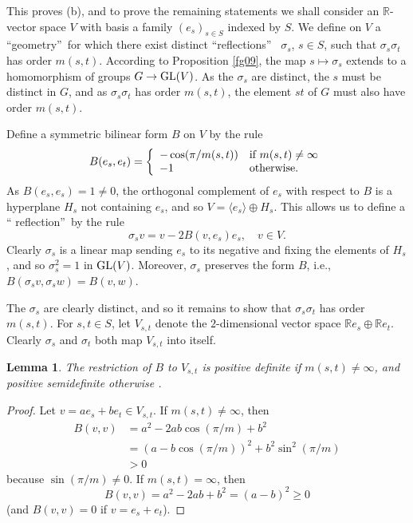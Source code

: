 \documentclass[a4paper,11pt,final,openany]{memoir}%
\newtheorem{lemma}[X]{Lemma}
\theoremstyle{nonumberplain}
\newtheorem{proof}{Proof.}
\begin{document}
This proves (b), and to prove the remaining statements we shall consider an
$\mathbb{R}{}$-vector space $V$ with basis a family $(e_{s})_{s\in S}$ indexed
by $S$. We define on $V$ a \textquotedblleft geometry\textquotedblright\ for
which there exist distinct \textquotedblleft reflections\textquotedblright%
\ $\sigma_{s}$, $s\in S$, such that $\sigma_{s}\sigma_{t}$ has order $m(s,t)$.
According to Proposition \ref{fg09}, the map $s\mapsto\sigma_{s}$ extends to a
homomorphism of groups $G\rightarrow\operatorname{GL}(V)$. As the $\sigma_{s}$ are distinct,
the $s$ must be distinct in $G$, and as $\sigma_{s}\sigma_{t}$ has order
$m(s,t)$, the element $st$ of $G$ must also have order $m(s,t)$.

Define a symmetric bilinear form $B$ on $V$ by the rule%
\[
B(e_{s},e_{t})=\left\{
\begin{array}
[c]{ll}%
-\cos(\pi/m(s,t)) & \text{if }m(s,t)\neq\infty\\
-1 & \text{otherwise.}%
\end{array}
\right.
\]
As $B(e_{s},e_{s})=1\neq0$, the orthogonal complement of $e_{s}$ with respect
to $B$ is a hyperplane $H_{s}$ not containing $e_{s}$, and so $V=\langle
e_{s}\rangle\oplus H_{s}$. This allows us to define a \textquotedblleft
reflection\textquotedblright\ by the rule%
\[
\sigma_{s}v=v-2B(v,e_{s})e_{s},\quad v\in V.
\]
Clearly $\sigma_{s}$ is a linear map sending $e_{s}$ to its negative and
fixing the elements of $H_{s}$, and so $\sigma_{s}^{2}=1$ in $\operatorname{GL}(V)$.
Moreover, $\sigma_{s}$ preserves the form $B$, i.e., $B(\sigma_{s}v,\sigma
_{s}w)=B(v,w)$.

The $\sigma_{s}$ are clearly distinct, and so it remains to show that
$\sigma_{s}\sigma_{t}$ has order $m(s,t)$. For $s,t\in S$, let $V_{s,t}$
denote the $2$-dimensional vector space $\mathbb{R}{}e_{s}\oplus\mathbb{R}%
{}e_{t}$. Clearly $\sigma_{s}$ and $\sigma_{t}$ both map $V_{s,t}$ into itself.

\begin{lemma}
\label{fg17}The restriction of $B$ to $V_{s,t}$ is positive definite if
$m(s,t)\neq\infty$, and positive semidefinite otherwise .
\end{lemma}

\begin{proof}
Let $v=ae_{s}+be_{t}\in V_{s,t}$. If $m(s,t)\neq\infty$, then%
\begin{align*}
B(v,v)  &  =a^{2}-2ab\cos(\pi/m)+b^{2}\\
&  =(a-b\cos(\pi/m))^{2}+b^{2}\sin^{2}(\pi/m)\\
&  >0
\end{align*}
because $\sin(\pi/m)\neq0$. If $m(s,t)=\infty$, then%
\[
B(v,v)=a^{2}-2ab+b^{2}=(a-b)^{2}\geq0
\]
(and $B(v,v)=0$ if $v=e_{s}+e_{t}$).
\end{proof}
\end{document}

